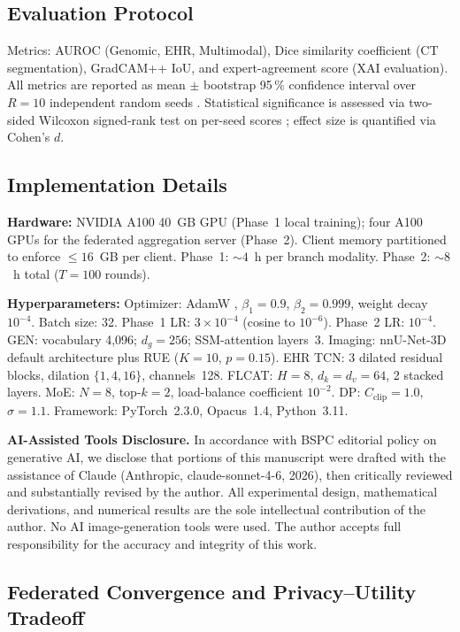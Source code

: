 \documentclass[a4paper,fleqn]{cas-dc}
\begin{document}
\subsection{Evaluation Protocol}

Metrics: AUROC (Genomic, EHR, Multimodal), Dice similarity coefficient
(CT segmentation), GradCAM++ IoU, and expert-agreement score (XAI evaluation).
All metrics are reported as mean $\pm$ bootstrap 95\,\% confidence interval
over $R\!=\!10$ independent random seeds \citep{efron1993bootstrap}.
Statistical significance is assessed via two-sided Wilcoxon signed-rank test
on per-seed scores \citep{wilcoxon1945}; effect size is quantified via Cohen's
$d$.

\subsection{Implementation Details}

\textbf{Hardware:} NVIDIA A100 40~GB GPU (Phase~1 local training); four
A100 GPUs for the federated aggregation server (Phase~2). Client memory
partitioned to enforce $\leq\!16$~GB per client. Phase~1: $\sim\!4$~h per
branch modality. Phase~2: $\sim\!8$~h total ($T\!=\!100$ rounds).

\textbf{Hyperparameters:} Optimizer: AdamW \citep{loshchilov2019adamw},
$\beta_1\!=\!0.9$, $\beta_2\!=\!0.999$, weight decay $10^{-4}$. Batch size: 32.
Phase~1 LR: $3\!\times\!10^{-4}$ (cosine to $10^{-6}$). Phase~2 LR: $10^{-4}$.
GEN: vocabulary 4,096; $d_g\!=\!256$; SSM-attention layers~3. Imaging: nnU-Net-3D
default architecture plus RUE ($K\!=\!10$, $p\!=\!0.15$). EHR TCN: 3 dilated
residual blocks, dilation $\{1,4,16\}$, channels~128. FLCAT: $H\!=\!8$,
$d_k\!=\!d_v\!=\!64$, 2 stacked layers. MoE: $N\!=\!8$, top-$k\!=\!2$,
load-balance coefficient $10^{-2}$. DP: $C_{\mathrm{clip}}\!=\!1.0$,
$\sigma\!=\!1.1$. Framework: PyTorch~2.3.0, Opacus~1.4, Python~3.11.

\noindent\textbf{AI-Assisted Tools Disclosure.}
In accordance with BSPC editorial policy on generative AI, we disclose that
portions of this manuscript were drafted with the assistance of Claude
(Anthropic, claude-sonnet-4-6, 2026), then critically reviewed and
substantially revised by the author. All experimental design, mathematical
derivations, and numerical results are the sole intellectual contribution of
the author. No AI image-generation tools were used. The author accepts full
responsibility for the accuracy and integrity of this work.

\subsection{Federated Convergence and Privacy--Utility Tradeoff}
\end{document}
